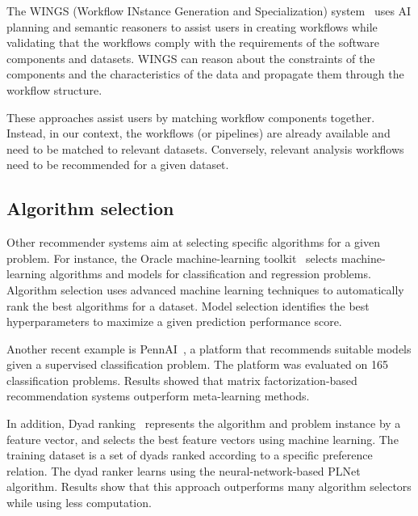 \documentclass[conference]{IEEEtran}
\begin{document}
The WINGS (Workflow INstance Generation and Specialization) system~\cite{gil2010wings} uses AI planning and semantic reasoners to assist users in creating workflows while validating that the workflows comply with the requirements of the software components and datasets. WINGS can reason about the constraints of the components and the characteristics of the data and propagate them through the workflow structure.

These approaches assist users by matching workflow components together. Instead, in our context, the workflows (or pipelines) are already available and need to be matched to relevant datasets. Conversely, relevant analysis workflows need to be recommended for a given dataset.

\subsection{Algorithm selection}

Other recommender systems aim at selecting specific algorithms for a given problem. For instance, the Oracle machine-learning toolkit~\cite{oracle} selects machine-learning algorithms and models for classiﬁcation and regression problems. Algorithm selection uses advanced machine learning techniques to automatically rank the best algorithms for a dataset. Model selection identifies the best hyperparameters to maximize a given prediction performance score. 

Another recent example is PennAI~\cite{la2021evaluating}, a platform that recommends suitable models given a supervised classification problem. The platform was evaluated on 165 classification problems. Results showed that matrix factorization-based recommendation systems outperform meta-learning methods.

In addition, Dyad ranking~\cite{tornede2019algorithm,tornede2020extreme} represents the algorithm and problem instance by a feature vector, and selects the best feature vectors using machine learning. The training dataset is a set of dyads ranked according to a specific preference relation. The dyad ranker learns using the neural-network-based PLNet~\cite{schafer2018dyad} algorithm. Results show that this approach outperforms many algorithm selectors while using less computation. 
\end{document}
